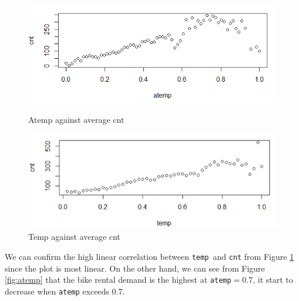\documentclass[12pt]{article}
\begin{document}
	\begin{figure}[H]
		\centering
		\begin{minipage}{.44\textwidth}
			\centering
			\includegraphics[width=\linewidth]{figures/atemp_cnt.png}
			\caption{Atemp against average cnt}
			\label{fig:atemp}
		\end{minipage}%
		\begin{minipage}{.44\textwidth}
			\centering
			\includegraphics[width=\linewidth]{figures/temp_cnt.png}
			\caption{Temp against average cnt}
			\label{fig:temp}
		\end{minipage}
	\end{figure}
   We can confirm the high linear correlation between \texttt{temp }and \texttt{cnt} from Figure \ref{fig:temp} since the plot is most linear. On the other hand, we can see from Figure \ref{fig:atemp} that the bike rental demand is the highest at \texttt{atemp}$=0.7$, it start to decrease when \texttt{atemp} exceeds 0.7. 
	
\end{document}
